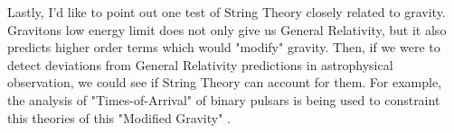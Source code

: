 \documentclass[12pt]{article}
\begin{document}
Lastly, I'd like to point out one test of String Theory closely related to gravity. Gravitons low energy limit does not only give us General Relativity, but it also predicts higher order terms which would "modify" gravity. Then, if we were to detect deviations from General Relativity predictions in astrophysical observation, we could see if String Theory can account for them. For example, the analysis of "Times-of-Arrival" of binary pulsars is being used to constraint this theories of this "Modified Gravity" \cite{Stairs:2005ai}.




\end{document}
